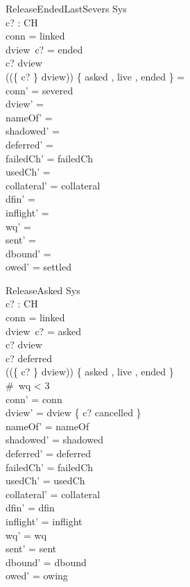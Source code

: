\documentclass[a4paper,10pt,fleqn]{article}
\begin{document}
\begin{schema}{ReleaseEndedLastSevers}
  \Delta Sys \\
  c? : CH \\
\where
  conn = linked \\
  dview~c? = ended \\
  c? \in \dom dview \\
  (\ran (\{ c? \} \ndres dview)) \cap \{ asked , live , ended \} = \emptyset \\
  conn' = severed \\
  dview' = \emptyset \\
  nameOf' = \emptyset \\
  shadowed' = \emptyset \\
  deferred' = \emptyset \\
  failedCh' = failedCh \\
  usedCh' = \emptyset \\
  collateral' = collateral \\
  dfin' = \emptyset \\
  inflight' = \langle \rangle \\
  wq' = \langle \rangle \\
  sent' = \langle \rangle \\
  dbound' = \emptyset \\
  owed' = settled
\end{schema}

\begin{schema}{ReleaseAsked}
  \Delta Sys \\
  c? : CH \\
\where
  conn = linked \\
  dview~c? = asked \\
  c? \in \dom dview \\
  c? \notin deferred \\
  (\ran (\{ c? \} \ndres dview)) \cap \{ asked , live , ended \} \neq \emptyset \\
  \#~wq < 3 \\
  conn' = conn \\
  dview' = dview \oplus \{ c? \mapsto cancelled \} \\
  nameOf' = nameOf \\
  shadowed' = shadowed \\
  deferred' = deferred \\
  failedCh' = failedCh \\
  usedCh' = usedCh \\
  collateral' = collateral \\
  dfin' = dfin \\
  inflight' = inflight \\
  wq' = wq \\
  sent' = sent \\
  dbound' = dbound \\
  owed' = owing
\end{schema}
\end{document}
